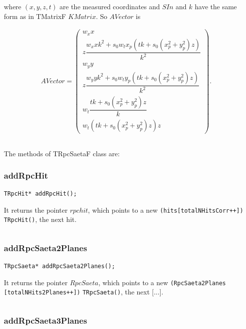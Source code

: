\documentclass[a4paper]{book}
\begin{document}
\begin{itemize}
	where $(x, y, z, t)$ are the measured coordinates and $SIn$ and $k$ have the same form as in TMatrixF $KMatrix$. So $AVector$ is
	
	\begin{align*}
	AVector = \left(
	\begin{array}{c}
	w_x x\\
	z \dfrac{w_x x k^2 + s_0 w_t x_p (t k+ s_0 (x_p^2 +y_p^2 )z)}{k^2}\\
	w_y y\\
	z \dfrac{w_y y k^2 + s_0 w_t y_p (t k+ s_0 (x_p^2 +y_p^2 )z)}{k^2}\\
	w_t \dfrac{t k + s_0 (x_p^2+ y_p^2)z}{k}\\
	w_t (t k + s_0 (x_p^2+ y_p^2)z) z
	\end{array} \right).
	\end{align*}
	
	
\end{itemize}

\[\]

The methods of TRpcSaetaF class are:

\subsubsection{addRpcHit}

\begin{lstlisting}
TRpcHit* addRpcHit();
\end{lstlisting}

It returns the pointer $rpchit$, which points to a new \texttt{(hits[totalNHitsCorr++]) TRpcHit()}, the next hit.

\[\]

\subsubsection{addRpcSaeta2Planes}

\begin{lstlisting}
TRpcSaeta* addRpcSaeta2Planes();
\end{lstlisting}

It returns the pointer $RpcSaeta$, which points to a new \texttt{(RpcSaeta2Planes} \texttt{[totalNHits2Planes++])} \texttt{TRpcSaeta()}, the next [...].

\[\]

\subsubsection{addRpcSaeta3Planes}
\end{document}
